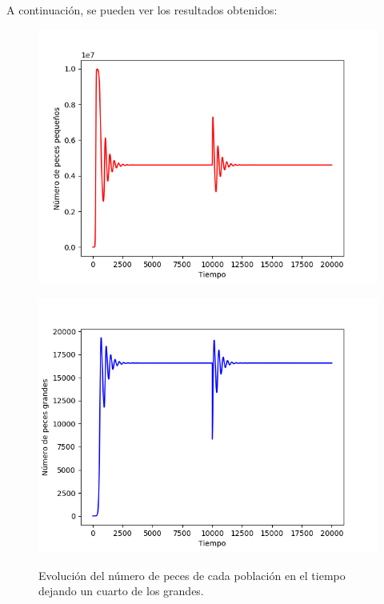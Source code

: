 \documentclass[11pt,a4paper]{report}
\begin{document}
A continuación, se pueden ver los resultados obtenidos:

\begin{figure}[H]
\centering
\begin{minipage}{.5\textwidth}
  \centering
  \includegraphics[scale=0.4]{img/peces-p-mitad.png}
  \label{fig:peces-p-mitad}
\end{minipage}%
\begin{minipage}{.5\textwidth}
  \centering
  \includegraphics[scale=0.4]{img/peces-g-mitad.png}
  \label{fig:peces-g-mitad}
\end{minipage}
\caption{Evolución del número de peces de cada población en el tiempo dejando un cuarto de los grandes.}
\end{figure}
\end{document}
